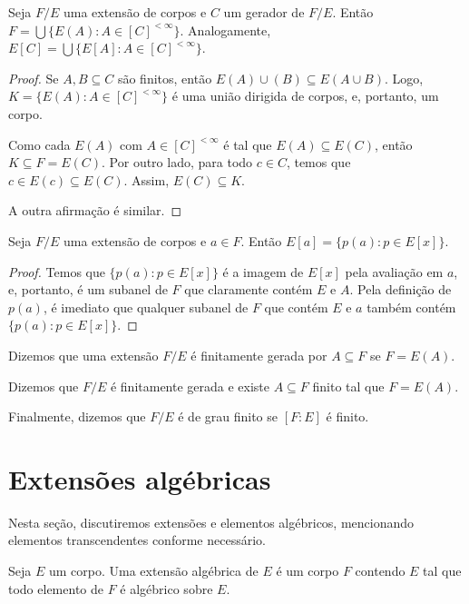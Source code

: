 \begin{lemma}
    Seja $F/E$ uma extensão de corpos e $C$ um gerador de $F/E$. Então $F=\bigcup\{E(A): A \in [C]^{<\infty}\}$. Analogamente, $E[C]=\bigcup\{E[A]: A \in [C]^{<\infty}\}$.
\end{lemma}

\begin{proof}
    Se $A, B\subseteq C$ são finitos, então $E(A)\cup (B)\subseteq E(A\cup B)$. Logo, $K=\{E(A): A \in [C]^{<\infty}\}$ é uma união dirigida de corpos, e, portanto, um corpo.

    Como cada $E(A)$ com $A\in [C]^{<\infty}$ é tal que $E(A)\subseteq E(C)$, então $K\subseteq F=E(C)$.
    Por outro lado, para todo $c \in C$, temos que $c \in E(c)\subseteq E(C)$.
    Assim, $E(C)\subseteq K$.

    A outra afirmação é similar.
\end{proof}

\begin{lemma}
    Seja $F/E$ uma extensão de corpos e $a \in F$. Então $E[a]=\{p(a): p \in E[x]\}$.
\end{lemma}

\begin{proof}
    Temos que $\{p(a): p \in E[x]\}$ é a imagem de $E[x]$ pela avaliação em $a$, e, portanto, é um subanel de $F$ que claramente contém $E$ e $A$. Pela definição de $p(a)$, é imediato que qualquer subanel de $F$ que contém $E$ e $a$ também contém $\{p(a): p \in E[x]\}$.
\end{proof}
\begin{definition}
Dizemos que uma extensão $F/E$ é finitamente gerada por $A\subseteq F$ se $F=E(A)$.

Dizemos que $F/E$ é finitamente gerada e existe $A\subseteq F$ finito tal que $F=E(A)$.

Finalmente, dizemos que $F/E$ é de grau finito se $[F:E]$ é finito.
\end{definition}
\section{Extensões algébricas}
Nesta seção, discutiremos extensões e elementos algébricos, mencionando elementos transcendentes conforme necessário.
\begin{definition}
Seja $E$ um corpo.
Uma extensão algébrica de $E$ é um corpo $F$ contendo $E$ tal que todo elemento de $F$ é algébrico sobre $E$.
\end{definition}

